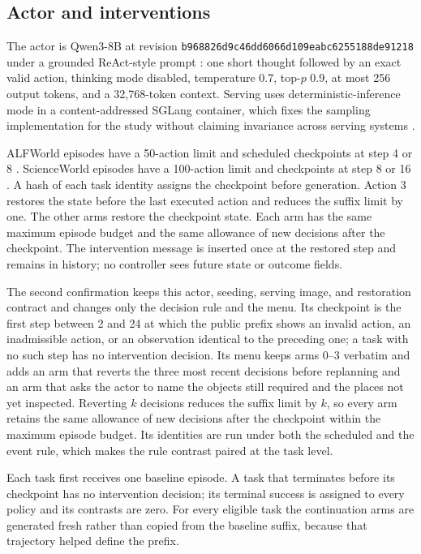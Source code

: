 \documentclass{article}
\begin{document}
\subsection{Actor and interventions}

The actor is Qwen3-8B at revision \texttt{b968826d9c46dd6066d109eabc6255188de91218} \citep{yang2025qwen3} under a grounded ReAct-style prompt \citep{yao2023react}: one short thought followed by an exact valid action, thinking mode disabled, temperature 0.7, top-$p$ 0.9, at most 256 output tokens, and a 32,768-token context. Serving uses deterministic-inference mode in a content-addressed SGLang container, which fixes the sampling implementation for the study without claiming invariance across serving systems \citep{bjarnason2026randomness}.

ALFWorld episodes have a 50-action limit and scheduled checkpoints at step 4 or 8 \citep{shridhar2021alfworld}. ScienceWorld episodes have a 100-action limit and checkpoints at step 8 or 16 \citep{wang2022scienceworld}. A hash of each task identity assigns the checkpoint before generation. Action 3 restores the state before the last executed action and reduces the suffix limit by one. The other arms restore the checkpoint state. Each arm has the same maximum episode budget and the same allowance of new decisions after the checkpoint. The intervention message is inserted once at the restored step and remains in history; no controller sees future state or outcome fields.

The second confirmation keeps this actor, seeding, serving image, and restoration contract and changes only the decision rule and the menu. Its checkpoint is the first step between 2 and 24 at which the public prefix shows an invalid action, an inadmissible action, or an observation identical to the preceding one; a task with no such step has no intervention decision. Its menu keeps arms 0--3 verbatim and adds an arm that reverts the three most recent decisions before replanning and an arm that asks the actor to name the objects still required and the places not yet inspected. Reverting $k$ decisions reduces the suffix limit by $k$, so every arm retains the same allowance of new decisions after the checkpoint within the maximum episode budget. Its \EventPlanned{} identities are run under both the scheduled and the event rule, which makes the rule contrast paired at the task level.

Each task first receives one baseline episode. A task that terminates before its checkpoint has no intervention decision; its terminal success is assigned to every policy and its contrasts are zero. For every eligible task the continuation arms are generated fresh rather than copied from the baseline suffix, because that trajectory helped define the prefix.
\end{document}
